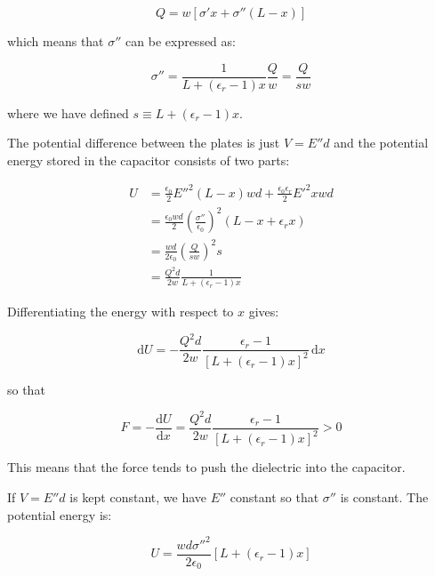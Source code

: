 \documentclass[12pt]{article}
\begin{document}
\begin{equation}
    Q = w \left[ \sigma' x + \sigma''(L - x) \right]
\end{equation}

which means that $\sigma''$ can be expressed as:

\begin{equation}
    \sigma'' = \frac{1}{L + (\epsilon_{r} - 1)x} \frac{Q}{w} = \frac{Q}{sw}
\end{equation}

where we have defined $s \equiv L + (\epsilon_{r} - 1)x$.

The potential difference between the plates is just $V = E'' d$ and the potential energy stored in the capacitor consists of two parts:

\begin{equation}
\begin{split}
    U &= \frac{\epsilon_{0}}{2} E''^{2} (L-x)wd + \frac{\epsilon_{0} \epsilon_{r}}{2} E'^{2} xwd \\
    &= \frac{\epsilon_{0}wd}{2} \left( \frac{\sigma''}{\epsilon_{0}} \right)^{2} (L - x + \epsilon_{r} x) \\
    &= \frac{wd}{2\epsilon_{0}} \left( \frac{Q}{sw} \right)^{2} s \\
    &= \frac{Q^{2}d}{2w} \frac{1}{L + (\epsilon_{r} - 1)x}
\end{split}
\end{equation}

Differentiating the energy with respect to $x$ gives:

\begin{equation}
    \mathrm{d}U = -\frac{Q^{2}d}{2w} \frac{\epsilon_{r} - 1}{[L + (\epsilon_{r} - 1)x]^{2}} \, \mathrm{d}x
\end{equation}

so that

\begin{equation}
    F = -\frac{\mathrm{d}U}{\mathrm{d}x} = \frac{Q^{2}d}{2w} \frac{\epsilon_{r} - 1}{[L + (\epsilon_{r} - 1)x]^{2}} > 0
\end{equation}

This means that the force tends to push the dielectric into the capacitor.

If $V = E'' d$ is kept constant, we have $E''$ constant so that $\sigma''$ is constant. The potential energy is:

\begin{equation}
    U = \frac{wd\sigma''^{2}}{2\epsilon_{0}} \left[ L + (\epsilon_{r} - 1)x \right]
\end{equation}
\end{document}
